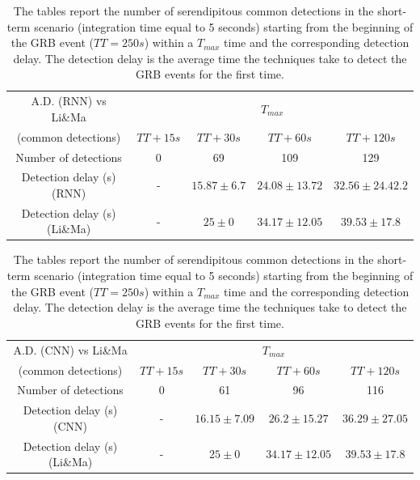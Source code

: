\begin{table}[ht] %
\begin{tabular}{|c|cccc|}  
\hline
\multicolumn{1}{|c|}{A.D. (RNN) vs Li\&Ma} & \multicolumn{4}{c|}{$T_{max}$}  \\
(common detections) & $TT+15s$ & $TT+30s$ &  $TT+60s$ & $TT+120s$        \\
\hline
Number of detections & 0 & 69 & 109 & 129           \\
\hline
Detection delay (s) (RNN)& - & $15.87 \pm 6.7$ & $24.08 \pm 13.72 $ & $32.56 \pm 24.42.2$        \\
\hline
Detection delay (s) (Li\&Ma)& - & $25 \pm 0$ & $34.17 \pm 12.05$  & $39.53 \pm 17.8$   \\
\hline
\end{tabular}
\vspace{1em}
\begin{tabular}{|c|cccc|}
\hline
\multicolumn{1}{|c|}{A.D. (CNN) vs Li\&Ma} & \multicolumn{4}{c|}{$T_{max}$}  \\
(common detections) & $TT+15s$ & $TT+30s$ &  $TT+60s$ & $TT+120s$        \\
\hline
Number of detections & 0 & 61 & 96 & 116           \\
\hline
Detection delay (s) (CNN)& - & $16.15 \pm 7.09$ & $26.2 \pm 15.27$  & $36.29 \pm 27.05$         \\
\hline
Detection delay (s) (Li\&Ma)& - & $25 \pm 0$ & $34.17 \pm 12.05$  & $39.53 \pm 17.8$   \\
\hline
\end{tabular}
\caption{The tables report the number of serendipitous common detections in the short-term scenario (integration time equal to 5 seconds) starting from the beginning of the GRB event ($TT=250s$) within a $T_{max}$ time and the corresponding detection delay. The detection delay is the average time the techniques take to detect the GRB events for the first time.}
\label{tab:serendipitous-detections-common-itime-5}
\end{table}
